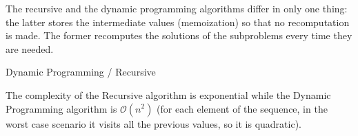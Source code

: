 The recursive and the dynamic programming algorithms differ in only one thing: the latter stores the intermediate values (memoization) so that no recomputation is made. The former recomputes the solutions of the subproblems every time they are needed.

\begin{algorithm}[H]
    \caption{Dynamic Programming / Recursive}
    \label{longest-increasing-subsequence:algorithm:recursive}
    \begin{algorithmic}[1]
    \end{algorithmic}
\end{algorithm}

The complexity of the Recursive algorithm is exponential while the Dynamic Programming algorithm is $\mathcal{O}(n^2)$ (for each element of the sequence, in the worst case scenario it visits all the previous values, so it is quadratic).

